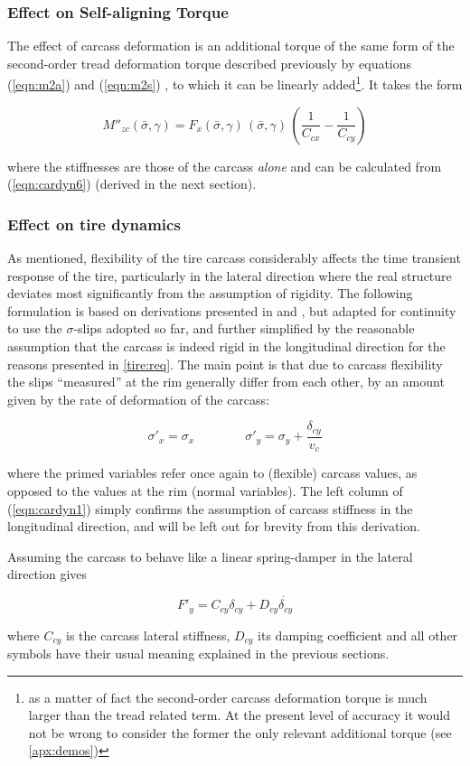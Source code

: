 \documentclass[12pt,a4paper]{report}
\newcommand{\virgolette}[1]{
\textquotedblleft #1\textquotedblright
}
\newcommand{\eq}[2]{
\begin{equation} \label{#1}
#2
\end{equation}
}
\newcommand{\req}[1]{
(\ref{#1})
}
\begin{document}
\subsubsection*{Effect on Self-aligning Torque}
The effect of carcass deformation is an additional torque of the same form of the second-order tread deformation torque described previously by equations \req{eqn:m2a} and \req{eqn:m2s}, to which it can be linearly added\footnote{as a matter of fact the second-order carcass deformation torque is much larger than the tread related term. At the present level of accuracy it would not be wrong to consider the former the only relevant additional torque (see \ref{apx:demos})}. It takes the form
\eq{eqn:carcaddtorque}{M''_{zc}(\bar{\sigma},\gamma) = F_x(\bar{\sigma},\gamma) \, (\bar{\sigma},\gamma) \, (\frac{1}{C_{cx}}-\frac{1}{C_{cy}})}
where the stiffnesses are those of the carcass \emph{alone} and can be calculated from \req{eqn:cardyn6} (derived in the next section).

\subsubsection{Effect on tire dynamics}
As mentioned, flexibility of the tire carcass considerably affects the time transient response of the tire, particularly in the lateral direction where the real structure deviates most significantly from the assumption of rigidity. The following formulation is based on derivations presented in \citep{nhtsa} and \citep{pacejka02}, but adapted for continuity to use the $\sigma$-slips adopted so far, and further simplified by the reasonable assumption that the carcass is indeed rigid in the longitudinal direction for the reasons presented in \ref{tire:req}.
The main point is that due to carcass flexibility the slips \virgolette{measured} at the rim generally differ from each other, by an amount given by the rate of deformation of the carcass:
\eq{eqn:cardyn1}{\sigma'_x = \sigma_x \qquad \qquad \sigma'_y = \sigma_y + \frac{\delta_{cy}}{v_c}}
where the primed variables refer once again to (flexible) carcass values, as opposed to the values at the rim (normal variables).
The left column of \req{eqn:cardyn1} simply confirms the assumption of carcass stiffness in the longitudinal direction, and will be left out for brevity from this derivation.

Assuming the carcass to behave like a linear spring-damper in the lateral direction gives
\eq{eqn:cardyn2}{F'_y = C_{cy}\delta_{cy} + D_{cy}\dot{\delta_{cy}}}
where $C_{cy}$ is the carcass lateral stiffness, $D_{cy}$ its damping coefficient and all other symbols have their usual meaning explained in the previous sections.
\end{document}
